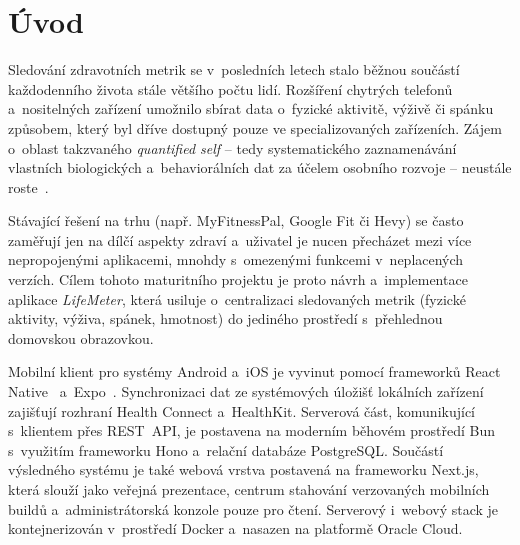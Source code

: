 \chapter*{Úvod}

Sledování zdravotních metrik se v~posledních letech stalo běžnou součástí každodenního života stále většího počtu lidí. Rozšíření chytrých telefonů a~nositelných zařízení umožnilo sbírat data o~fyzické aktivitě, výživě či spánku způsobem, který byl dříve dostupný pouze ve specializovaných zařízeních. Zájem o~oblast takzvaného \textit{quantified self} -- tedy systematického zaznamenávání vlastních biologických a~behaviorálních dat za účelem osobního rozvoje -- neustále roste~\cite{swan2013quantified}.

Stávající řešení na trhu (např. MyFitnessPal, Google Fit či Hevy) se často zaměřují jen na dílčí aspekty zdraví a~uživatel je nucen přecházet mezi více nepropojenými aplikacemi, mnohdy s~omezenými funkcemi v~neplacených verzích. Cílem tohoto maturitního projektu je proto návrh a~implementace aplikace \textit{LifeMeter}, která usiluje o~centralizaci sledovaných metrik (fyzické aktivity, výživa, spánek, hmotnost) do jediného prostředí s~přehlednou domovskou obrazovkou.

Mobilní klient pro systémy Android a~iOS je vyvinut pomocí frameworků React Native~\cite{reactnative} a~Expo~\cite{expo}. Synchronizaci dat ze systémových úložišť lokálních zařízení zajišťují rozhraní Health Connect a~HealthKit. Serverová část, komunikující s~klientem přes REST~API, je postavena na moderním běhovém prostředí Bun~\cite{bun} s~využitím frameworku Hono a~relační databáze PostgreSQL. Součástí výsledného systému je také webová vrstva postavená na frameworku Next.js, která slouží jako veřejná prezentace, centrum stahování verzovaných mobilních buildů a~administrátorská konzole pouze pro čtení. Serverový i~webový stack je kontejnerizován v~prostředí Docker a~nasazen na platformě Oracle Cloud.
